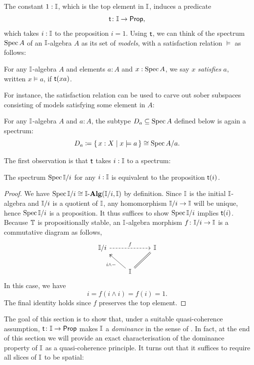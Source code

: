 The constant $1 : \mathbb{I}$, which is the top element in $\mathbb{I}$, induces a predicate
\[ \istsym\colon \I \to \pp\text{,} \]
which takes $i : \mathbb{I}$ to the proposition $i = 1$. Using $\mathsf{t}$, we can think of the spectrum $\operatorname{Spec} A$ of an $\mathbb{I}$-algebra $A$ as its set of \emph{models}, with a satisfaction relation $\models$ as follows:

\begin{definition}[Satisfaction]
  For any $\mathbb{I}$-algebra $A$ and elements $a:A$ and $x:\operatorname{Spec} A$, we say $x$ \emph{satisfies} $a$, written $x \models a$, if $\mathsf{t}(xa)$.
\end{definition}

For instance, the satisfaction relation can be used to carve out sober subspaces consisting of models satisfying some element in $A$:

\begin{example}
  For any $\mathbb{I}$-algebra $A$ and $a:A$, the subtype $D_a\subseteq \operatorname{Spec} A$ defined below is again a spectrum:
  \[ D_a \coloneq \scomp{x : X}{x \models a} \cong \spec A/a\text{.} \]
\end{example}

The first observation is that $\mathsf{t}$ takes $i : \mathbb{I}$ to a spectrum:

\begin{lemma}\label{lem:openpropsober}
  The spectrum $\operatorname{Spec}\mathbb{I}/i$ for any $i:\mathbb{I}$ is equivalent to the proposition $\mathsf{t}(i)$.
\end{lemma}
\begin{proof}
  We have $\spec \I/i \cong \I\alg(\I/i,\I)$ by definition. Since $\mathbb{I}$ is the initial $\mathbb{I}$-algebra and $\mathbb{I}/i$ is a quotient of $\mathbb{I}$, any homomorphism $\mathbb{I}/i \to \mathbb{I}$ will be unique, hence $\operatorname{Spec}\mathbb{I}/i$ is a proposition. It thus suffices to show $\operatorname{Spec}\mathbb{I}/i$ implies $\mathsf{t}(i)$. Because $\mathbb{T}$ is propositionally stable, an $\mathbb{I}$-algebra morphism $f \colon \mathbb{I}/i \to \mathbb{I}$ is a commutative diagram as follows,
  \[
  \begin{tikzcd}
    \I/i \ar[rr, dashed, "f"] & & \I \\ 
    & \I \ar[ul, two heads, "i \wedge -"] \ar[ur, equal]
  \end{tikzcd}
  \]
  In this case, we have
  \[ i = f(i \wedge i) = f(i) = 1\text{.} \]
  The final identity holds since $f$ preserves the top element. 
\end{proof}

The goal of this section is to show that, under a suitable quasi-coherence assumption, $\mathsf{t}\colon \mathbb{I} \to \mathsf{Prop}$ makes $\mathbb{I}$ a \emph{dominance} in the sense of \citet{rosolini1986continuity}. In fact, at the end of this section we will provide an exact characterisation of the dominance property of $\mathbb{I}$ as a quasi-coherence principle. It turns out that it suffices to require all slices of $\mathbb{I}$ to be spatial:

